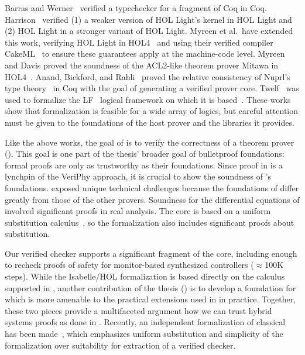 \documentclass[12pt]{cmuthesis}
\theoremstyle{definition}
\theoremstyle{remark}
\newcommand{\rref}[2][]{\prettyref{#2}}
\newcommand{\Isabelle}{Isabelle/HOL\xspace}
\newcommand{\VeriPhy}{VeriPhy\xspace}
\begin{document}
Barras and Werner~\cite{Barras:1997} verified a typechecker for a fragment of Coq in Coq.
Harrison~\cite{Harrison:2006} verified (1) a weaker version of HOL Light's kernel in HOL Light and (2) HOL Light in a stronger variant of HOL Light.
Myreen et al.\ have extended this work, verifying HOL Light in HOL4~\cite{Myreen+Owens+Kumar:2013,DBLP:journals/jar/KumarAMO16} and using their verified compiler CakeML~\cite{DBLP:conf/popl/KumarMNO14} to ensure these guarantees apply at the machine-code level.
Myreen and Davis proved the soundness of the ACL2-like theorem prover Mitawa in HOL4~\cite{Myreen+Davis:itp:2014}.
Anand, Bickford, and Rahli~\cite{DBLP:conf/itp/AnandR14,Rahli+Bickford:cpp:2016} proved the relative consistency of Nuprl's type theory~\cite{Constable+al:1986,Allen+al:2006} in Coq with the goal of generating a verified prover core.
Twelf~\cite{DBLP:conf/cade/PfenningS99} was used to formalize the LF~\cite{DBLP:journals/jacm/HarperHP93} logical framework on which it is based~\cite{martens2012lf}.
These works show that formalization is feasible for a wide array of logics, but careful attention must be given to the foundations of the host prover and the libraries it provides.

%
Like the above works, the goal of \rref{sec:isabelle-fml} is to verify the correctness of a theorem prover (\KeYmaeraX).
This goal is one part of the thesis' broader goal of bulletproof foundations: formal proofs are only as trustworthy as their foundations.
Since proof in \dL is a lynchpin of the \VeriPhy approach, it is crucial to show the soundness of \dL's foundations.
%
\rref{sec:isabelle-fml} exposed unique technical challenges because the foundations of \dL differ greatly from those of the other provers.
Soundness for the differential equations of \dL involved significant proofs in real analysis.
The \KeYmaeraX core is based on a uniform substitution calculus~\cite{DBLP:journals/jar/Platzer17}, so the formalization also includes significant proofs about substitution.

Our verified checker supports a significant fragment of the \KeYmaeraX core, including enough to recheck proofs of safety for monitor-based synthesized controllers (${\approx}$100K steps).
While the \Isabelle formalization is based directly on the calculus supported in \KeYmaeraX, another contribution of the thesis (\rref{sec:definite-description}) is to develop a foundation for \dL which is more amenable to the practical extensions used in \KeYmaeraX in practice.
Together, these two pieces provide a multifaceted argument how we can trust hybrid systems proofs as done in \KeYmaeraX.
Recently, an independent formalization of classical \dGL has been made~\cite{DBLP:journals/afp/Platzer19}, which emphasizes uniform substitution and simplicity of the formalization over suitability for extraction of a verified checker.
\end{document}
